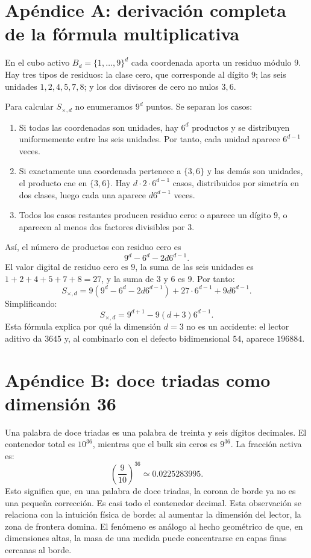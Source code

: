 \documentclass[11pt,a4paper]{article}
\begin{document}
\appendix
\section{Apéndice A: derivación completa de la fórmula multiplicativa}
En el cubo activo $B_d=\{1,\ldots,9\}^d$ cada coordenada aporta un residuo módulo $9$. Hay tres tipos de residuos: la clase cero, que corresponde al dígito $9$; las seis unidades $1,2,4,5,7,8$; y los dos divisores de cero no nulos $3,6$.

Para calcular $S_{\times,d}$ no enumeramos $9^d$ puntos. Se separan los casos:
\begin{enumerate}
\item Si todas las coordenadas son unidades, hay $6^d$ productos y se distribuyen uniformemente entre las seis unidades. Por tanto, cada unidad aparece $6^{d-1}$ veces.
\item Si exactamente una coordenada pertenece a $\{3,6\}$ y las demás son unidades, el producto cae en $\{3,6\}$. Hay $d\cdot2\cdot6^{d-1}$ casos, distribuidos por simetría en dos clases, luego cada una aparece $d6^{d-1}$ veces.
\item Todos los casos restantes producen residuo cero: o aparece un dígito $9$, o aparecen al menos dos factores divisibles por $3$.
\end{enumerate}
Así, el número de productos con residuo cero es
\[
9^d-6^d-2d6^{d-1}.
\]
El valor digital de residuo cero es $9$, la suma de las seis unidades es $1+2+4+5+7+8=27$, y la suma de $3$ y $6$ es $9$. Por tanto:
\[
S_{\times,d}=9(9^d-6^d-2d6^{d-1})+27\cdot6^{d-1}+9d6^{d-1}.
\]
Simplificando:
\[
\boxed{S_{\times,d}=9^{d+1}-9(d+3)6^{d-1}.}
\]
Esta fórmula explica por qué la dimensión $d=3$ no es un accidente: el lector aditivo da $3645$ y, al combinarlo con el defecto bidimensional $54$, aparece $196884$.

\section{Apéndice B: doce triadas como dimensión 36}
Una palabra de doce triadas es una palabra de treinta y seis dígitos decimales. El contenedor total es $10^{36}$, mientras que el bulk sin ceros es $9^{36}$. La fracción activa es:
\[
\left(\frac{9}{10}\right)^{36}\simeq 0.0225283995.
\]
Esto significa que, en una palabra de doce triadas, la corona de borde ya no es una pequeña corrección. Es casi todo el contenedor decimal. Esta observación se relaciona con la intuición física de borde: al aumentar la dimensión del lector, la zona de frontera domina. El fenómeno es análogo al hecho geométrico de que, en dimensiones altas, la masa de una medida puede concentrarse en capas finas cercanas al borde.
\end{document}
